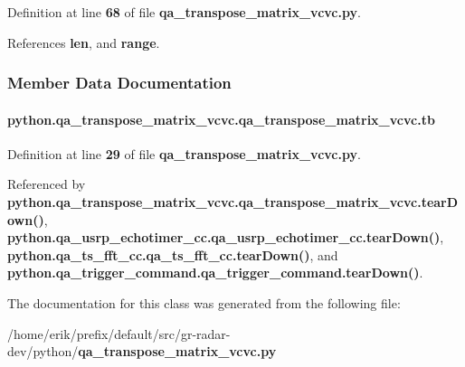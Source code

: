 Definition at line {\bf 68} of file {\bf qa\+\_\+transpose\+\_\+matrix\+\_\+vcvc.\+py}.



References {\bf len}, and {\bf range}.



\subsubsection{Member Data Documentation}
\paragraph[{tb}]{\setlength{\rightskip}{0pt plus 5cm}python.\+qa\+\_\+transpose\+\_\+matrix\+\_\+vcvc.\+qa\+\_\+transpose\+\_\+matrix\+\_\+vcvc.\+tb}\label{classpython_1_1qa__transpose__matrix__vcvc_1_1qa__transpose__matrix__vcvc_ab590d999f8996b238d741d23ce72ff0e}


Definition at line {\bf 29} of file {\bf qa\+\_\+transpose\+\_\+matrix\+\_\+vcvc.\+py}.



Referenced by {\bf python.\+qa\+\_\+transpose\+\_\+matrix\+\_\+vcvc.\+qa\+\_\+transpose\+\_\+matrix\+\_\+vcvc.\+tear\+Down()}, {\bf python.\+qa\+\_\+usrp\+\_\+echotimer\+\_\+cc.\+qa\+\_\+usrp\+\_\+echotimer\+\_\+cc.\+tear\+Down()}, {\bf python.\+qa\+\_\+ts\+\_\+fft\+\_\+cc.\+qa\+\_\+ts\+\_\+fft\+\_\+cc.\+tear\+Down()}, and {\bf python.\+qa\+\_\+trigger\+\_\+command.\+qa\+\_\+trigger\+\_\+command.\+tear\+Down()}.



The documentation for this class was generated from the following file\+:\begin{DoxyCompactItemize}
\item 
/home/erik/prefix/default/src/gr-\/radar-\/dev/python/{\bf qa\+\_\+transpose\+\_\+matrix\+\_\+vcvc.\+py}\end{DoxyCompactItemize}
